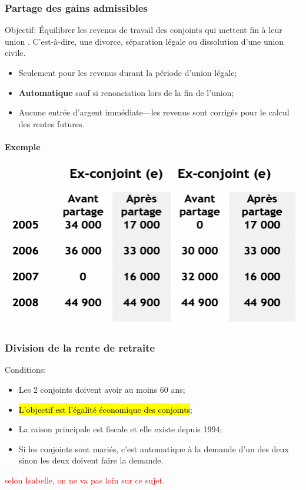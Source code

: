 \documentclass[10pt, french]{article}
\begin{document}
\begin{multicols*}{3}
\subsubsection*{Partage des gains admissibles}
Objectif: Équilibrer les revenus de travail des conjoints qui \og mettent fin à leur union \fg{}. C'est-à-dire, une divorce, séparation légale ou dissolution d'une union civile.
\begin{itemize}[leftmargin = *]
	\item	Seulement pour les revenus durant la période d'union légale;
	\item	\textbf{Automatique} sauf si renonciation lors de la fin de l'union;
	\item	Aucune entrée d'argent immédiate---les revenus sont corrigés pour le calcul des rentes futures.
\end{itemize}

\paragraph*{Exemple}
\begin{center}
	\includegraphics[scale=0.4]{src/ACT-1005/exemple-DIVORCE.png}
\end{center}


\subsubsection*{Division de la rente de retraite}
Conditions:
\begin{itemize}[leftmargin = *]
	\item	Les 2 conjoints doivent avoir au moins 60 ans;
	\item	\hl{L'objectif est l'égalité économique des conjoints};
	\item	La raison principale est fiscale et elle existe depuis 1994;
	\item	Si les conjoints sont mariés, c'est automatique à la demande d'un des deux sinon les deux doivent faire la demande.
\end{itemize}
\textcolor{red}{selon Isabelle, on ne va pas loin sur ce sujet.}



\end{multicols*}
\end{document}
